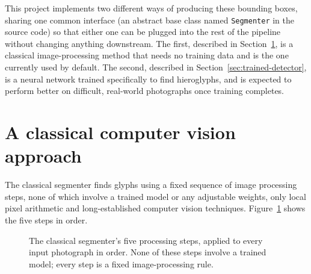 \documentclass[11pt,a4paper]{report}
\begin{document}
This project implements two different ways of producing these bounding
boxes, sharing one common interface (an abstract base class named
\texttt{Segmenter} in the source code) so that either one can be plugged
into the rest of the pipeline without changing anything downstream. The
first, described in Section~\ref{sec:classical-cv}, is a classical
image-processing method that needs no training data and is the one
currently used by default. The second, described in
Section~\ref{sec:trained-detector}, is a neural network trained
specifically to find hieroglyphs, and is expected to perform better on
difficult, real-world photographs once training completes.

\section{A classical computer vision approach}
\label{sec:classical-cv}

The classical segmenter finds glyphs using a fixed sequence of image
processing steps, none of which involve a trained model or any adjustable
weights, only local pixel arithmetic and long-established computer vision
techniques. Figure~\ref{fig:classical-cv} shows the five steps in order.

\begin{figure}[t]
\centering
{}
\caption{The classical segmenter's five processing steps, applied to every
input photograph in order. None of these steps involve a trained model;
every step is a fixed image-processing rule.}
\label{fig:classical-cv}
\end{figure}
\end{document}
